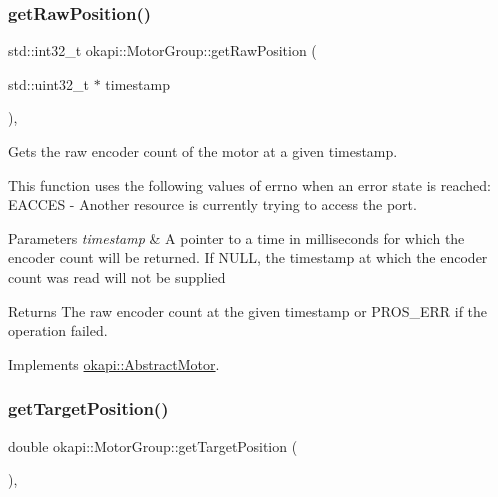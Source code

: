 \subsubsection{\texorpdfstring{getRawPosition()}{getRawPosition()}}
{\footnotesize\ttfamily std\+::int32\+\_\+t okapi\+::\+Motor\+Group\+::get\+Raw\+Position (\begin{DoxyParamCaption}\item[{std\+::uint32\+\_\+t $\ast$}]{timestamp }\end{DoxyParamCaption})\hspace{0.3cm}{\ttfamily [override]}, {\ttfamily [virtual]}}

Gets the raw encoder count of the motor at a given timestamp.

This function uses the following values of errno when an error state is reached\+: E\+A\+C\+C\+ES -\/ Another resource is currently trying to access the port.


\begin{DoxyParams}{Parameters}
{\em timestamp} & A pointer to a time in milliseconds for which the encoder count will be returned. If N\+U\+LL, the timestamp at which the encoder count was read will not be supplied\\
\hline
\end{DoxyParams}
\begin{DoxyReturn}{Returns}
The raw encoder count at the given timestamp or {\ttfamily P\+R\+O\+S\+\_\+\+E\+RR} if the operation failed. 
\end{DoxyReturn}


Implements \mbox{\hyperlink{classokapi_1_1AbstractMotor_aa34fefa954fbff26e3d68e59c4f10964}{okapi\+::\+Abstract\+Motor}}.

\mbox{\label{classokapi_1_1MotorGroup_ad6332111f8b2642bc13fbd8822328121}} 
\subsubsection{\texorpdfstring{getTargetPosition()}{getTargetPosition()}}
{\footnotesize\ttfamily double okapi\+::\+Motor\+Group\+::get\+Target\+Position (\begin{DoxyParamCaption}{ }\end{DoxyParamCaption})\hspace{0.3cm}{\ttfamily [override]}, {\ttfamily [virtual]}}

